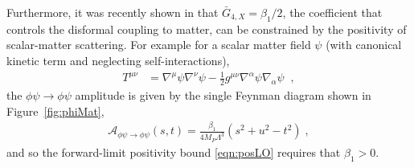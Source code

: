 \documentclass[11pt]{article}
\newcommand{\G}{  \bar{G} }
\begin{document}
Furthermore, it was recently shown in \cite{deRham:2021fpu} that $\G_{4,X} = \beta_1/2$, the coefficient that controls the disformal coupling to matter, can be constrained by the positivity of scalar-matter scattering. 
For example for a scalar matter field $\psi$ (with canonical kinetic term and neglecting self-interactions),
\begin{align}
 T^{\mu\nu} &= \nabla^\mu \psi \nabla^\nu \psi - \frac{1}{2} g^{\mu\nu} \nabla^\alpha \psi \nabla_\alpha \psi \;\; ,
 \label{eqn:Tscalar}
\end{align} 
the $\phi \psi \to \phi \psi$ amplitude is given by the single Feynman diagram shown in Figure~\ref{fig:phiMat},
\begin{align}
\mathcal{A}_{\phi \psi \to \phi \psi} (s,t) =  \frac{ \beta_1  }{4 M_P \Lambda^3} ( s^2  + u^2 - t^2 ) \; , 
\end{align}
and so the forward-limit positivity bound \eqref{eqn:posLO} requires that $\beta_1 > 0$. 
\end{document}
